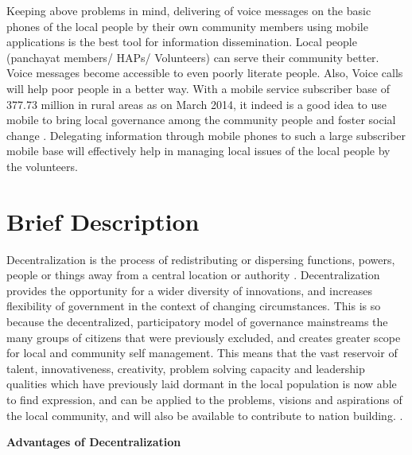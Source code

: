 Keeping above problems in mind, delivering of voice messages on the basic phones of the local people by their own community members using mobile applications is the best tool for information dissemination. Local people (panchayat members/ HAPs/ Volunteers) can serve their community better.  Voice messages become accessible to even poorly literate people. Also, Voice calls will help poor people in a better way. With a mobile service subscriber base of  377.73 million in rural areas as on March 2014, it indeed is a good idea to use mobile to bring local governance among the community people and foster social change \cite{ruralbase:online}. Delegating information through mobile phones to such a  large subscriber mobile base will effectively help in managing local issues of the local people by the volunteers.

\section{Brief Description}
Decentralization is the process of redistributing or dispersing functions, powers, people or things away from a central location or authority \cite{bardhan2002decentralization}. Decentralization provides the opportunity for a wider diversity of innovations, and increases flexibility of government in the context of changing circumstances. This is so because the decentralized, participatory model of governance mainstreams the many groups of citizens that were previously excluded, and creates greater scope for local and community self management. This means that the vast reservoir of talent, innovativeness, creativity, problem solving capacity and leadership qualities which have previously laid dormant in the local population is now able to find expression, and can be applied to the problems, visions and aspirations of the local community, and will also be available to contribute to nation building. \cite{Decentral:online}.

\textbf{Advantages of Decentralization}

